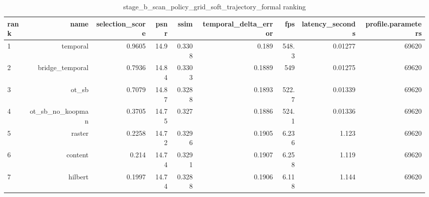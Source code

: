 \begin{table}[t]
\centering
\caption{stage\_b\_scan\_policy\_grid\_soft\_trajectory\_formal ranking}
\begin{tabular}{lrrrrrrrr}
\toprule
rank & name & selection\_score & psnr & ssim & temporal\_delta\_error & fps & latency\_seconds & profile.parameters \\
\midrule
1 & temporal & 0.9605 & 14.9 & 0.3308 & 0.189 & 548.3 & 0.01277 & 69620 \\
2 & bridge\_temporal & 0.7936 & 14.84 & 0.3303 & 0.1889 & 549 & 0.01275 & 69620 \\
3 & ot\_sb & 0.7079 & 14.87 & 0.3288 & 0.1893 & 522.7 & 0.01339 & 69620 \\
4 & ot\_sb\_no\_koopman & 0.3705 & 14.75 & 0.327 & 0.1886 & 524.1 & 0.01336 & 69620 \\
5 & raster & 0.2258 & 14.72 & 0.3296 & 0.1905 & 6.236 & 1.123 & 69620 \\
6 & content & 0.214 & 14.74 & 0.3291 & 0.1907 & 6.258 & 1.119 & 69620 \\
7 & hilbert & 0.1997 & 14.74 & 0.3288 & 0.1906 & 6.118 & 1.144 & 69620 \\
\bottomrule
\end{tabular}
\end{table}
